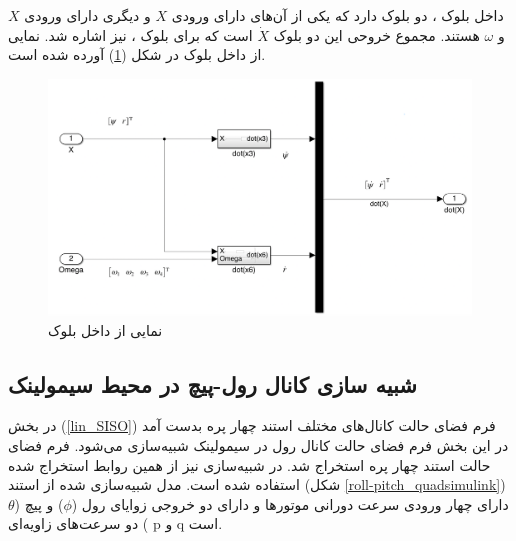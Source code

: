 داخل بلوک
،
دو بلوک دارد که یکی از آن‌های دارای ورودی $X$ و دیگری دارای ورودی $X$ و $\omega$ هستند. مجموع خروحی این دو بلوک $\dot X$ است که برای بلوک
،
نیز اشاره شد.
نمایی از داخل بلوک
در شکل (\ref{yaw_all-six}) آورده شده است.
\begin{figure}[H]
	\includegraphics[width=16cm]{../../Figures/QuadSimulation/yaw_all-six.png}
	\centering
	\caption{نمایی از داخل بلوک }
	\label{yaw_all-six}
\end{figure}

\subsection{شبیه سازی کانال رول-پیچ در محیط سیمولینک}
در بخش
(\ref{lin_SISO})
فرم فضای حالت کانال‌های مختلف استند چهار پره بدست آمد در این بخش فرم فضای حالت کانال رول در سیمولینک شبیه‌سازی می‌شود.
 فرم فضای حالت استند چهار پره استخراج شد. در شبیه‌سازی نیز از همین روابط استخراج شده استفاده شده است. مدل شبیه‌سازی شده از استند (شکل \ref{roll-pitch_quadsimulink}) دارای چهار ورودی سرعت دورانی موتورها  و دارای دو خروجی زوایای رول ($\phi$) و پیچ ($\theta$)  دو سرعت‌های زاویه‌ای
p
و
q
است.


